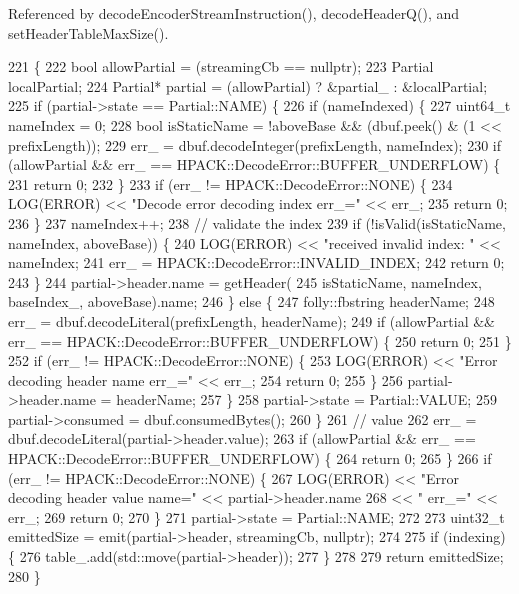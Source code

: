 Referenced by decode\+Encoder\+Stream\+Instruction(), decode\+Header\+Q(), and set\+Header\+Table\+Max\+Size().


\begin{DoxyCode}
221                                          \{
222   \textcolor{keywordtype}{bool} allowPartial = (streamingCb == \textcolor{keyword}{nullptr});
223   Partial localPartial;
224   Partial* partial = (allowPartial) ? &partial_ : &localPartial;
225   \textcolor{keywordflow}{if} (partial->state == Partial::NAME) \{
226     \textcolor{keywordflow}{if} (nameIndexed) \{
227       uint64\_t nameIndex = 0;
228       \textcolor{keywordtype}{bool} isStaticName = !aboveBase && (dbuf.peek() & (1 << prefixLength));
229       err_ = dbuf.decodeInteger(prefixLength, nameIndex);
230       \textcolor{keywordflow}{if} (allowPartial && err_ == HPACK::DecodeError::BUFFER_UNDERFLOW) \{
231         \textcolor{keywordflow}{return} 0;
232       \}
233       \textcolor{keywordflow}{if} (err_ != HPACK::DecodeError::NONE) \{
234         LOG(ERROR) << \textcolor{stringliteral}{"Decode error decoding index err\_="} << err_;
235         \textcolor{keywordflow}{return} 0;
236       \}
237       nameIndex++;
238       \textcolor{comment}{// validate the index}
239       \textcolor{keywordflow}{if} (!isValid(isStaticName, nameIndex, aboveBase)) \{
240         LOG(ERROR) << \textcolor{stringliteral}{"received invalid index: "} << nameIndex;
241         err_ = HPACK::DecodeError::INVALID_INDEX;
242         \textcolor{keywordflow}{return} 0;
243       \}
244       partial->header.name = getHeader(
245           isStaticName, nameIndex, baseIndex_, aboveBase).name;
246     \} \textcolor{keywordflow}{else} \{
247       folly::fbstring headerName;
248       err_ = dbuf.decodeLiteral(prefixLength, headerName);
249       \textcolor{keywordflow}{if} (allowPartial && err_ == HPACK::DecodeError::BUFFER_UNDERFLOW) \{
250         \textcolor{keywordflow}{return} 0;
251       \}
252       \textcolor{keywordflow}{if} (err_ != HPACK::DecodeError::NONE) \{
253         LOG(ERROR) << \textcolor{stringliteral}{"Error decoding header name err\_="} << err_;
254         \textcolor{keywordflow}{return} 0;
255       \}
256       partial->header.name = headerName;
257     \}
258     partial->state = Partial::VALUE;
259     partial->consumed = dbuf.consumedBytes();
260   \}
261   \textcolor{comment}{// value}
262   err_ = dbuf.decodeLiteral(partial->header.value);
263   \textcolor{keywordflow}{if} (allowPartial && err_ == HPACK::DecodeError::BUFFER_UNDERFLOW) \{
264     \textcolor{keywordflow}{return} 0;
265   \}
266   \textcolor{keywordflow}{if} (err_ != HPACK::DecodeError::NONE) \{
267     LOG(ERROR) << \textcolor{stringliteral}{"Error decoding header value name="} << partial->header.name
268                << \textcolor{stringliteral}{" err\_="} << err_;
269     \textcolor{keywordflow}{return} 0;
270   \}
271   partial->state = Partial::NAME;
272 
273   uint32\_t emittedSize = emit(partial->header, streamingCb, \textcolor{keyword}{nullptr});
274 
275   \textcolor{keywordflow}{if} (indexing) \{
276     table_.add(std::move(partial->header));
277   \}
278 
279   \textcolor{keywordflow}{return} emittedSize;
280 \}
\end{DoxyCode}
